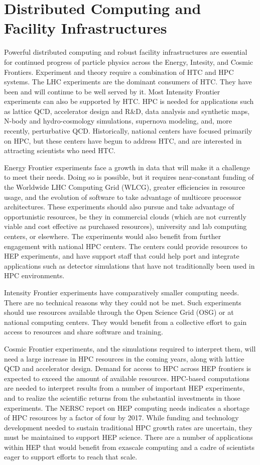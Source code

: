 \section{Distributed Computing and Facility Infrastructures}

Powerful distributed computing and robust facility infrastructures are essential for continued progress of particle physics across the Energy, Intesity, and Cosmic Frontiers.  Experiment and theory require a combination of HTC and HPC systems.  The LHC experiments are the dominant consumers of HTC.  They have been and will continue to be well served by it.  Most Intensity Frontier experiments can also be supported by HTC.  HPC is needed for applications such as lattice QCD, accelerator design and R\&D, data analysis and synthetic maps, N-body and hydro-cosmology simulations, supernova modeling, and, more recently, perturbative QCD.  Historically, national centers have focused primarily on HPC, but these centers have begun to address HTC, and are interested in attracting scientists who need HTC.

Energy Frontier experiments face a growth in data that will make it a challenge to meet their needs.  Doing so is possible, but it requires near-constant funding of the Worldwide LHC Computing Grid (WLCG), greater efficiencies in resource usage, and the evolution of software to take advantage of multicore processor architectures.   These experiments should also pursue and take advantage of opportunistic resources, be they in commercial clouds (which are not currently viable and cost effective as purchased resources), university and lab computing centers, or elsewhere.  The experiments would also benefit from further engagement with national HPC centers.  The centers could provide resources to HEP experiments, and have support staff that could help port and integrate applications such as detector simulations that have not traditionally been used in HPC environments.

Intensity Frontier experiments have comparatively smaller computing needs.  There are no technical reasons why they could not be met.  Such experiments should  use resources available through the Open Science Grid (OSG) or at national computing centers.  They would benefit from a collective effort to gain access to resources and share software and training.

Cosmic Frontier experiments,  and the simulations required to interpret them, will need a large increase in HPC resources in the coming years, along with lattice QCD and accelerator design.  Demand for access to HPC across HEP frontiers is expected to exceed the amount of available resources.  HPC-based computations are needed to interpret results from a number of important HEP experiments, and to realize the scientific returns from the substantial investments in those experiments.  The NERSC report on HEP computing needs indicates a shortage of HPC resources by a factor of four by 2017.  While funding and technology development needed to sustain traditional HPC growth rates are uncertain, they must be maintained to support HEP science.  There are a number of applications within HEP that would benefit from exascale computing and a cadre of scientists eager to support efforts to reach that scale.

